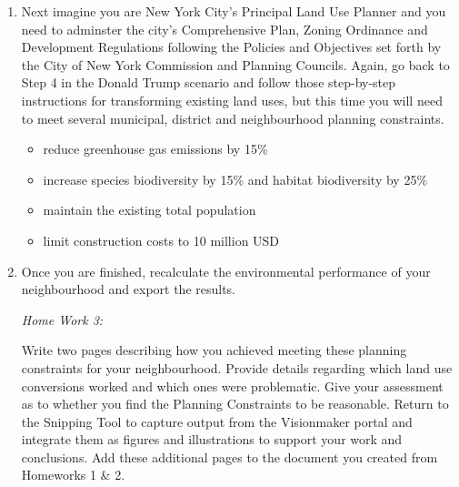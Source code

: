 \documentclass{article}
\begin{document}
\begin{enumerate}[leftmargin=15mm]

\item Next imagine you are New York City's Principal Land Use Planner and you need to adminster the city's Comprehensive Plan, Zoning Ordinance and Development Regulations following the Policies and Objectives set forth by the City of New York Commission and Planning Councils.  Again, go back to Step 4 in the Donald Trump scenario and follow those step-by-step instructions for transforming existing land uses, but this time you will need to meet several municipal, district and neighbourhood planning constraints.

\begin{itemize}

\item reduce greenhouse gas emissions by 15\%

\item increase species biodiversity by 15\% and habitat biodiversity by 25\%

\item maintain the existing total population

\item limit construction costs to 10 million USD

\end{itemize}

\item Once you are finished, recalculate the environmental performance of your neighbourhood and export the results.  

\vspace{4mm}
\setlength{\leftskip}{0cm}
\textit{Home Work 3:}

Write two pages describing how you achieved meeting these planning constraints for your neighbourhood.  Provide details regarding which land use conversions worked and which ones were problematic.  Give your assessment as to whether you find the Planning Constraints to be reasonable.  Return to the Snipping Tool to capture output from the Visionmaker portal and integrate them as figures and illustrations to support your work and conclusions.  Add these additional pages to the document you created from Homeworks 1 \& 2.  

\end{enumerate}
 

\setlength{\leftskip}{0cm}
 
\end{document}
